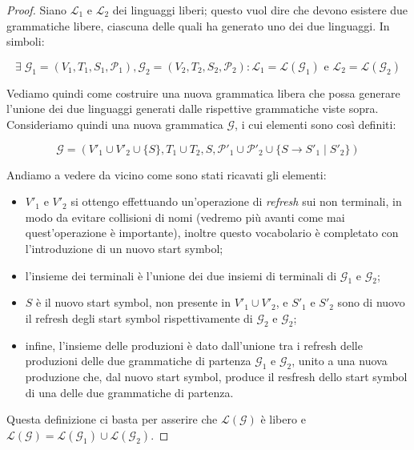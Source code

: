 \documentclass[class=book, crop=false, oneside, 12pt]{standalone}
\begin{document}
\begin{proof}
    Siano \(\mathcal{L}_1\) e \(\mathcal{L}_2\) dei linguaggi liberi; questo vuol dire che devono esistere due grammatiche libere, ciascuna delle quali ha generato uno dei due linguaggi. In simboli:

  \begin{equation*}
    \exists\; \mathcal{G}_1 = (V_1, T_1, S_1, \mathcal{P}_1), \mathcal{G}_2 = (V_2, T_2, S_2, \mathcal{P}_2) : \mathcal{L}_1 = \mathcal{L}(\mathcal{G}_1) \textrm{ e } \mathcal{L}_2 = \mathcal{L}(\mathcal{G}_2)
  \end{equation*}

  Vediamo quindi come costruire una nuova grammatica libera che possa generare l'unione dei due linguaggi generati dalle rispettive grammatiche viste sopra. Consideriamo quindi una nuova grammatica \(\mathcal{G}\), i cui elementi sono così definiti:

  \begin{equation*}
      \mathcal{G} = (V'_1 \cup V'_2 \cup \{S\}, T_1 \cup T_2, S, \mathcal{P}'_1 \cup \mathcal{P}'_2 \cup \{S \rightarrow S'_1 \mid S'_2\})
  \end{equation*}

  \noindent Andiamo a vedere da vicino come sono stati ricavati gli elementi:

  \begin{itemize}
    \item \(V'_1\) e \(V'_2\) si ottengo effettuando un'operazione di \emph{refresh} sui non terminali, in modo da evitare collisioni di nomi (vedremo più avanti come mai quest'operazione è importante), inoltre questo vocabolario è completato con l'introduzione di un nuovo start symbol;
    \item l'insieme dei terminali è l'unione dei due insiemi di terminali di \(\mathcal{G}_1\) e \(\mathcal{G}_2\);
    \item \(S\) è il nuovo start symbol, non presente in \(V'_1 \cup V'_2\), e \(S'_1\) e \(S'_2\) sono di nuovo il refresh degli start symbol rispettivamente di \(\mathcal{G}_2\) e \(\mathcal{G}_2\);
    \item infine, l'insieme delle produzioni è dato dall'unione tra i refresh delle produzioni delle due grammatiche di partenza  \(\mathcal{G}_1\) e \(\mathcal{G}_2\), unito a una nuova produzione che, dal nuovo start symbol, produce il resfresh dello start symbol di una delle due grammatiche di partenza.
  \end{itemize}

  \noindent Questa definizione ci basta per asserire che \(\mathcal{L(G)}\) è libero e \(\mathcal{L(G)} = \mathcal{L}(\mathcal{G}_1)  \cup \mathcal{L}(\mathcal{G}_2) \).

\end{proof}
\end{document}

